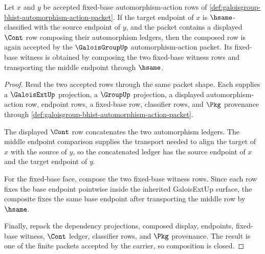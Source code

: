 \begin{theorem}
\label{thm:galoisgroup-composition-closure}
Let $x$ and $y$ be accepted fixed-base automorphism-action rows of
\autoref{def:galoisgroup-bhist-automorphism-action-packet}. If the target
endpoint of $x$ is $\hsame$-classified with the source endpoint of $y$, and
the packet contains a displayed $\Cont$ row composing their automorphism
ledgers, then the composed row is again accepted by the $\GaloisGroupUp$
automorphism-action packet. Its fixed-base witness is obtained by composing
the two fixed-base witness rows and transporting the middle endpoint through
$\hsame$.
\end{theorem}
\begin{proof}
Read the two accepted rows through the same packet shape. Each supplies a
$\GaloisExtUp$ projection, a $\GroupUp$ projection, a displayed
automorphism-action row, endpoint rows, a fixed-base row, classifier rows, and
$\Pkg$ provenance through
\autoref{def:galoisgroup-bhist-automorphism-action-packet}.

The displayed $\Cont$ row concatenates the two automorphism ledgers. The
middle endpoint comparison supplies the transport needed to align the target
of $x$ with the source of $y$, so the concatenated ledger has the source
endpoint of $x$ and the target endpoint of $y$.

For the fixed-base face, compose the two fixed-base witness rows. Since each
row fixes the base endpoint pointwise inside the inherited GaloisExtUp
surface, the composite fixes the same base endpoint after transporting the
middle row by $\hsame$.

Finally, repack the dependency projections, composed display, endpoints,
fixed-base witness, $\Cont$ ledger, classifier rows, and $\Pkg$ provenance.
The result is one of the finite packets accepted by the carrier, so
composition is closed.
\end{proof}

